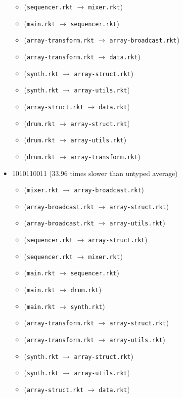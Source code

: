 \documentclass{article}
\newcommand{\mono}[1]{\texttt{#1}}
\begin{document}
\begin{itemize}
\begin{itemize}
  \item (\mono{sequencer.rkt} $\rightarrow$ \mono{mixer.rkt})
  \item (\mono{main.rkt} $\rightarrow$ \mono{sequencer.rkt})
  \item (\mono{array-transform.rkt} $\rightarrow$ \mono{array-broadcast.rkt})
  \item (\mono{array-transform.rkt} $\rightarrow$ \mono{data.rkt})
  \item (\mono{synth.rkt} $\rightarrow$ \mono{array-struct.rkt})
  \item (\mono{synth.rkt} $\rightarrow$ \mono{array-utils.rkt})
  \item (\mono{array-struct.rkt} $\rightarrow$ \mono{data.rkt})
  \item (\mono{drum.rkt} $\rightarrow$ \mono{array-struct.rkt})
  \item (\mono{drum.rkt} $\rightarrow$ \mono{array-utils.rkt})
  \item (\mono{drum.rkt} $\rightarrow$ \mono{array-transform.rkt})
  \end{itemize}
\item 1010110011 (33.96 times slower than untyped average)
  \begin{itemize}
  \item (\mono{mixer.rkt} $\rightarrow$ \mono{array-broadcast.rkt})
  \item (\mono{array-broadcast.rkt} $\rightarrow$ \mono{array-struct.rkt})
  \item (\mono{array-broadcast.rkt} $\rightarrow$ \mono{array-utils.rkt})
  \item (\mono{sequencer.rkt} $\rightarrow$ \mono{array-struct.rkt})
  \item (\mono{sequencer.rkt} $\rightarrow$ \mono{mixer.rkt})
  \item (\mono{main.rkt} $\rightarrow$ \mono{sequencer.rkt})
  \item (\mono{main.rkt} $\rightarrow$ \mono{drum.rkt})
  \item (\mono{main.rkt} $\rightarrow$ \mono{synth.rkt})
  \item (\mono{array-transform.rkt} $\rightarrow$ \mono{array-struct.rkt})
  \item (\mono{array-transform.rkt} $\rightarrow$ \mono{array-utils.rkt})
  \item (\mono{synth.rkt} $\rightarrow$ \mono{array-struct.rkt})
  \item (\mono{synth.rkt} $\rightarrow$ \mono{array-utils.rkt})
  \item (\mono{array-struct.rkt} $\rightarrow$ \mono{data.rkt})

\end{itemize}
\end{itemize}
\end{document}
